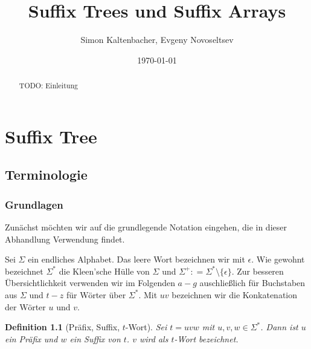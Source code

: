 \documentclass[12pt]{report}
\title{Suffix Trees und Suffix Arrays}
\author{Simon Kaltenbacher, Evgeny Novoseltsev}
\date{\today}
\newtheorem{definition}{Definition}
\newcommand{\coloneqq}{\mathrel{\mathop:}=}
\begin{document}
\maketitle

\tableofcontents

\begin{abstract}
TODO: Einleitung
\end{abstract}

\chapter{Suffix Tree}
\label{chap:SuffixTree}

\section{Terminologie}
\label{sec:Terminologie}

\subsection{Grundlagen}
\label{sec:Grundlagen}

Zunächst möchten wir auf die grundlegende Notation eingehen, die in dieser Abhandlung Verwendung findet.

Sei $\Sigma$ ein endliches Alphabet. Das leere Wort bezeichnen wir mit $\epsilon$. Wie gewohnt bezeichnet $\Sigma^*$ die Kleen'sche Hülle von $\Sigma$ und $\Sigma^+ \coloneqq \Sigma^* \setminus \{\epsilon\}$. Zur besseren Übersichtlichkeit verwenden wir im Folgenden $a - g$ auschließlich für Buchstaben aus $\Sigma$ und $t - z$ für Wörter über $\Sigma^*$. Mit $uv$ bezeichnen wir die Konkatenation der Wörter $u$ und $v$.

\begin{definition}[Präfix, Suffix, $t$-Wort]
Sei $t = uvw$ mit $u, v, w \in \Sigma^*$. Dann ist $u$ ein Präfix und $w$ ein Suffix von $t$. $v$ wird als $t$-Wort bezeichnet.
\end{definition}
\end{document}
